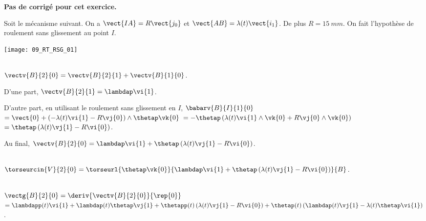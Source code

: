 \normalfalse \difficiletrue \tdifficilefalse
\correctiontrue


\setcounter{numques}{0}
\ifcorrection
\else
\textbf{Pas de corrigé pour cet exercice.}
\fi

\ifprof
\else
Soit le mécanisme suivant. On a $\vect{IA}=R\vect{j_0}$ et $\vect{AB}=\lambda(t)\vect{i_1}$. De plus $R=\SI{15}{mm}$.
On fait l'hypothèse de roulement sans glissement au point $I$.
\begin{center}
\texttt{[image: 09\_RT\_RSG\_01]}
\end{center}
\fi


\ifprof ~\\
$\vectv{B}{2}{0}=\vectv{B}{2}{1}+\vectv{B}{1}{0}$.

D'une part,  $\vectv{B}{2}{1}=\lambdap\vi{1}$.

D'autre part, en utilisant le roulement sans glissement en $I$, 
$\babarv{B}{I}{1}{0} $ $=\vect{0}+\left(-\lambda(t)\vi{1}-R\vj{0} \right)\wedge\thetap \vk{0}$
$=-\thetap\left(\lambda(t)\vi{1}\wedge \vk{0}+R\vj{0}\wedge \vk{0} \right)$
$=\thetap\left(\lambda(t)\vj{1}-R\vi{0} \right)$.

Au final, $\vectv{B}{2}{0} = \lambdap\vi{1} + \thetap\left(\lambda(t)\vj{1}-R\vi{0} \right)$.

\else
\fi

\ifprof ~\\
$\torseurcin{V}{2}{0}=\torseurl{\thetap \vk{0}}{ \lambdap\vi{1} + \thetap\left(\lambda(t)\vj{1}-R\vi{0} \right)}{B}$.
\else
\fi

\ifprof ~\\
$\vectg{B}{2}{0} = \deriv{\vectv{B}{2}{0}}{\rep{0}}$
$ = \lambdapp(t)\vi{1} +\lambdap(t)\thetap\vj{1} 
+ \thetapp(t)\left(\lambda(t)\vj{1}-R\vi{0} \right)
+ \thetap(t)\left(\lambdap(t)\vj{1}-\lambda(t)\thetap\vi{1} \right)
$.
\else
\fi

